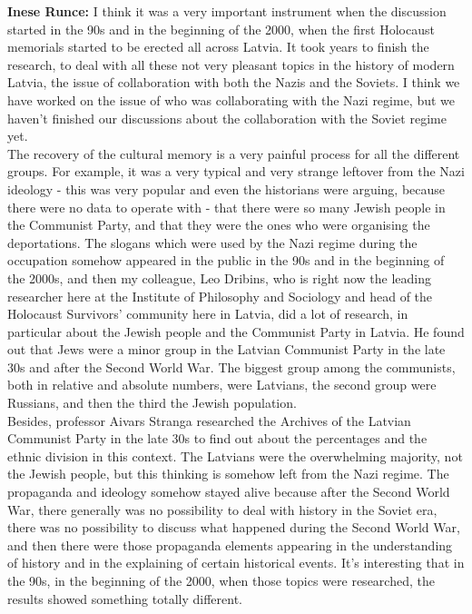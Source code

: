 \textbf{Inese Runce:} I think it was a very important instrument when the discussion started in the 90s and in the beginning of the 2000, when the first Holocaust memorials started to be erected all across Latvia. It took years to finish the research, to deal with all these not very pleasant topics in the history of modern Latvia, the issue of collaboration with both the Nazis and the Soviets. I think we have worked on the issue of who was collaborating with the Nazi regime, but we haven’t finished our discussions about the collaboration with the Soviet regime yet.\\
The recovery of the cultural memory is a very painful process for all the different groups. For example, it was a very typical and very strange leftover from the Nazi ideology - this was very popular and even the historians were arguing, because there were no data to operate with - that there were so many Jewish people in the Communist Party, and that they were the ones who were organising the deportations. The slogans which were used by the Nazi regime  during the occupation somehow appeared in the public in the 90s and in the beginning of the 2000s, and then my colleague, Leo Dribins, who is right now the leading researcher here at the Institute of Philosophy and Sociology and head of the Holocaust Survivors' community here in Latvia, did a lot of research, in particular about the Jewish people and the Communist Party in Latvia. He found out that Jews were a minor group in the Latvian Communist Party in the late 30s and after the Second World War. The biggest group among the communists, both in relative and absolute numbers, were Latvians, the second group were Russians, and then the third the Jewish population.\\
Besides, professor Aivars Stranga researched the Archives of the Latvian Communist Party in the late 30s to find out about the percentages and the ethnic division in this context. The Latvians were the overwhelming majority, not the Jewish people, but this thinking is somehow left from the Nazi regime. The propaganda and ideology somehow stayed alive because after the Second World War, there generally was no possibility to deal with history in the Soviet era, there was no possibility to discuss what happened during the Second World War, and then there were those propaganda elements appearing in the understanding of history and in the explaining of certain historical events. It's interesting that in the 90s, in the beginning of the 2000, when those topics were researched, the results showed something totally different.

